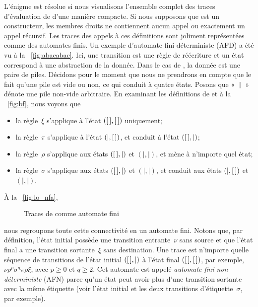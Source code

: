 L'énigme est résolue si nous visualisons l'ensemble complet des traces
d'évaluation de
 d'une manière compacte. Si nous
supposons que  est un constructeur,
les membres droits ne contiennent aucun appel ou exactement un appel
récursif. Les traces des appels à ces définitions sont joliment
représentées comme des automates finis. Un
exemple d'automate fini déterministe (AFD) a été vu à la \fig~\vref{fig:abacabac}. Ici,
une transition est une règle de réécriture et un état correspond à une
abstraction de la donnée. Dans le cas de , la donnée est une
paire de piles. Décidons pour le moment que nous ne prendrons en
compte que le fait qu'une pile est vide ou non, ce qui conduit à
quatre états. Posons que «~\texttt{|}~» dénote une pile non-vide
arbitraire. En examinant les définitions de
 et  à
la \fig~\vref{fig:bf}, nous voyons que
\begin{itemize}

  \item la règle~\(\xi\) s'applique à l'état \(([\,],[\,])\) uniquement;

  \item la règle~\(\pi\) s'applique à l'état \((\mid,[\,])\), et
    conduit à l'état \(([\,],\mid)\);

  \item la règle~\(\rho\) s'applique aux états \(([\,],\mid)\) et
    \((\mid,\mid)\), et mène à n'importe quel état;

  \item la règle~\(\sigma\) s'applique aux états \(([\,],\mid)\) et
    \((\mid,\mid)\), et conduit aux états \((\mid,[\,])\) et
    \((\mid,\mid)\).

\end{itemize}
À la \fig~\vref{fig:lo_nfa},
\begin{figure}
\centering
{}
\quad
{}
\caption{Traces de  comme automate fini}
\end{figure}
nous regroupons toute cette connectivité en un automate fini. Notons
que, par définition, l'état initial possède une transition
entrante~\(\nu\) sans source et que l'état final a une transition
sortante~\(\xi\) sans destination. Une trace est n'importe quelle
séquence de transitions de l'état initial \(([\,],\mid)\) à l'état
final \(([\,],[\,])\), par exemple, \(\nu\rho^p\sigma^q\pi\rho\xi\),
avec \(p \geqslant 0\) et \(q \geqslant 2\). Cet automate est appelé
\emph{automate fini non-déterministe} (AFN) parce qu'un état peut avoir plus d'une
transition sortante avec la même étiquette (voir l'état initial et les
deux transitions d'étiquette~\(\sigma\), par exemple).

